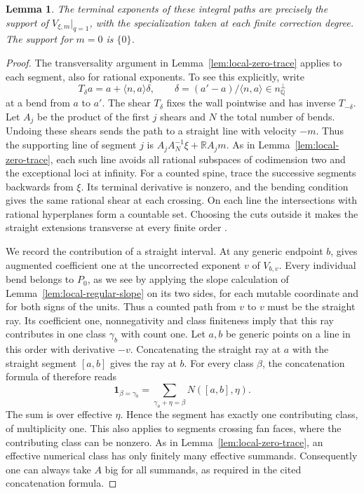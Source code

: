\documentclass[11pt,reqno]{amsart}
\numberwithin{equation}{section}
\newtheorem{lemma}[theorem]{Lemma}
\theoremstyle{definition}
\theoremstyle{remark}
\begin{document}
\begin{lemma}\label{lem:path-support}
The terminal exponents of these integral paths are precisely the
support of \(V_{\xi,m}|_{q=1}\), with the specialization taken at each
finite correction degree. The support for \(m=0\) is \(\{0\}\).
\end{lemma}
\begin{proof}
The transversality argument in Lemma~\ref{lem:local-zero-trace}
applies to each segment, also for rational exponents. To see this
explicitly, write
\[ T_\delta a=a+\langle n,a\rangle\delta,\qquad \delta=(a'-a)/\langle n,a\rangle\in n^\perp_{\mathbb Q} \]
at a bend from \(a\) to \(a'\). The shear \(T_\delta\) fixes the wall
pointwise and has inverse \(T_{-\delta}\). Let \(A_j\) be the product
of the first \(j\) shears and \(N\) the total number of bends.
Undoing these shears sends the path to a straight line with velocity
\(-m\). Thus the supporting line of segment \(j\) is
\(A_jA_N^{-1}\xi+\mathbb R A_jm\). As in
Lemma~\ref{lem:local-zero-trace}, each such line avoids all rational
subspaces of codimension two and the exceptional loci at infinity.
For a counted spine, trace the successive segments backwards from
\(\xi\). Its terminal derivative is nonzero, and the bending condition
\cite[Definition~4.17]{KY} gives the same rational shear at each
crossing. On each line the intersections with rational hyperplanes
form a countable set. Choosing the cuts outside it makes the straight
extensions transverse at every finite order
\cite[Construction~4.15 and Definition~4.20]{KY}.

We record the contribution of a straight interval. At any generic
endpoint \(b\), \cite[Lemma~20.34]{KY} gives augmented coefficient
one at the uncorrected exponent \(v\) of \(V_{b,v}\).
Every individual bend belongs to \(P_0\), as we see by applying
the slope calculation
of Lemma~\ref{lem:local-regular-slope} on its two sides, for each mutable coordinate
and for both signs of the units. Thus a counted path from \(v\) to \(v\)
must be the straight ray. Its coefficient one, nonnegativity and
class finiteness \cite[Lemma~20.31]{KY} imply that this ray contributes
in one class \(\gamma_b\) with count one. Let \(a,b\) be generic
points on a line in this order with derivative \(-v\). Concatenating
the straight ray at \(a\) with the straight segment \([a,b]\) gives
the ray at \(b\). For every class \(\beta\), the concatenation formula
of \cite[Theorem~12.4]{KY} therefore reads
\[ \mathbf 1_{\beta=\gamma_b} =\sum_{\gamma_a+\eta=\beta} N([a,b],\eta). \]
The sum is over effective \(\eta\). Hence the segment has exactly one
contributing class, of multiplicity one. This also applies to segments crossing fan faces, where the contributing
class can be nonzero. As in Lemma~\ref{lem:local-zero-trace}, an effective
numerical class has only finitely many effective summands.
Consequently one can always take \(A\) big for all summands, as
required in the cited concatenation formula.


\end{proof}
\end{document}
